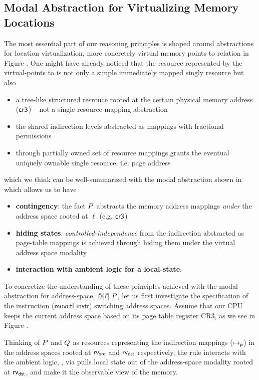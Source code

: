 \subsection{Modal Abstraction for Virtualizing Memory Locations}
\label{sec:modallocationvirtualization}

The most essential part of our reasoning principles is shaped around abstractions for location virtualization, more concretely virtual memory points-to relation in Figure . One might have already noticed that the resource represented by the virtual-points to is not only a simple immediately mapped singly resource but also
\begin{itemize}
\item a tree-like structured resrouce rooted at the certain physical memory address ($\mathsf{cr3}$) -- not a single resource mapping abstraction 
\item the shared indirection levels abstracted as mappings with fractional permissions
\item through partially owned set of resource mappings grants the eventual uniquely ownable single resource, i.e. page address 
\end{itemize}
which we think can be well-summarized with the modal abstraction shown in  which allows us to have
\begin{itemize}
  \item \textbf{contingency}: the fact $P$ abstracts the memory address mappings \textit{under} the address space rooted at $\ell$ (e.g. $\mathsf{cr3}$)
  \item \textbf{hiding states}: \textit{controlled-independence} from the indirection abstracted as page-table mappings is achieved through hiding them under the virtual address space modality
  \item \textbf{interaction with ambient logic for a local-state}: 
\end{itemize}

To concretize the understanding of these principles achieved with the modal abstraction for address-space, $@[\ell]\; P$, let us first investigate the specification of the instruction ($\textsf{movctl\_instr}$) switching address spaces. Assume that our CPU keeps the current address space based on its page table register CR3, as we see in Figure .

Thinking of $P$ and $Q$ as resources representing the indirection mappings ($\mapsto_{\mathsf{p}}$) in the address spaces rooted at $\mathsf{rv}_{\textsf{src}}$ and $\mathsf{rv}_{\textsf{dst}}$ respectively, the rule interacts with the ambient logic, \SL, via pulls local state out of the address-space modality rooted at $\mathsf{rv}_{\textsf{dst}}$, and make it the observable view of the memory.
